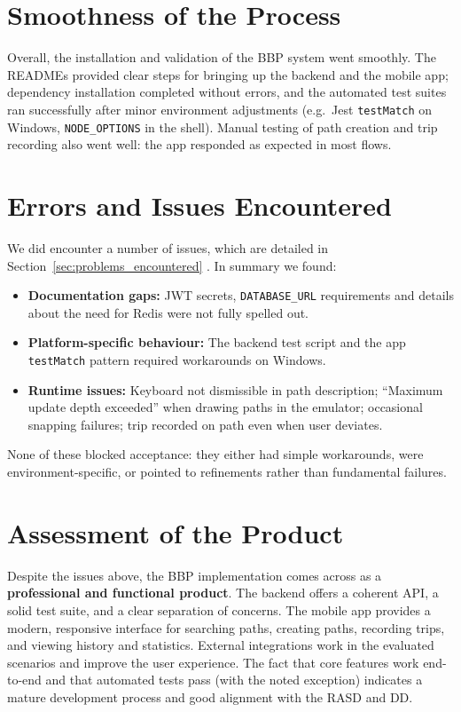 \section{Smoothness of the Process}
\label{sec:conclusion_smoothness}%
Overall, the installation and validation of the BBP system went smoothly. The READMEs provided clear steps for bringing up the backend and the mobile app; dependency installation completed without errors, and the automated test suites ran successfully after minor environment adjustments (e.g.\ Jest \texttt{testMatch} on Windows, \texttt{NODE\_OPTIONS} in the shell). Manual testing of path creation and trip recording also went well: the app responded as expected in most flows.

\section{Errors and Issues Encountered}
\label{sec:conclusion_errors}%
We did encounter a number of issues, which are detailed in Section~\ref{sec:problems_encountered} . In summary we found:
\begin{itemize}
    \item \textbf{Documentation gaps:} JWT secrets, \texttt{DATABASE\_URL} requirements and details about the need for Redis were not fully spelled out.
    \item \textbf{Platform-specific behaviour:} The backend test script and the app \texttt{testMatch} pattern required workarounds on Windows.
    \item \textbf{Runtime issues:} Keyboard not dismissible in path description; ``Maximum update depth exceeded'' when drawing paths in the emulator; occasional snapping failures; trip recorded on path even when user deviates.
\end{itemize}
None of these blocked acceptance: they either had simple workarounds, were environment-specific, or pointed to refinements rather than fundamental failures.

\section{Assessment of the Product}
\label{sec:conclusion_assessment}%
Despite the issues above, the BBP implementation comes across as a \textbf{professional and functional product}. The backend offers a coherent API, a solid test suite, and a clear separation of concerns. The mobile app provides a modern, responsive interface for searching paths, creating paths, recording trips, and viewing history and statistics. External integrations work in the evaluated scenarios and improve the user experience. The fact that core features work end-to-end and that automated tests pass (with the noted exception) indicates a mature development process and good alignment with the RASD and DD.

